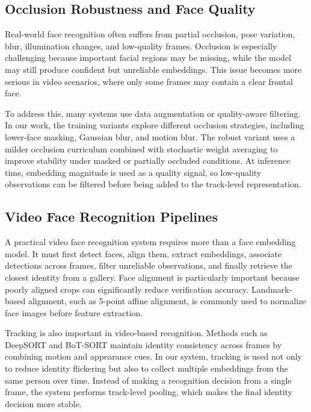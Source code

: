 \subsection{Occlusion Robustness and Face Quality}

Real-world face recognition often suffers from partial occlusion, pose variation, blur, illumination changes, and low-quality frames. Occlusion is especially challenging because important facial regions may be missing, while the model may still produce confident but unreliable embeddings. This issue becomes more serious in video scenarios, where only some frames may contain a clear frontal face.

To address this, many systems use data augmentation or quality-aware filtering. In our work, the training variants explore different occlusion strategies, including lower-face masking, Gaussian blur, and motion blur. The robust variant uses a milder occlusion curriculum combined with stochastic weight averaging to improve stability under masked or partially occluded conditions\cite{izmailov2019averagingweightsleadswider}. At inference time, embedding magnitude is used as a quality signal, so low-quality observations can be filtered before being added to the track-level representation.

\subsection{Video Face Recognition Pipelines}

A practical video face recognition system requires more than a face embedding model. It must first detect faces, align them, extract embeddings, associate detections across frames, filter unreliable observations, and finally retrieve the closest identity from a gallery. Face alignment is particularly important because poorly aligned crops can significantly reduce verification accuracy. Landmark-based alignment, such as 5-point affine alignment, is commonly used to normalize face images before feature extraction.

Tracking is also important in video-based recognition. Methods such as DeepSORT and BoT-SORT maintain identity consistency across frames by combining motion and appearance cues\cite{deepsort}\cite{botsort}. In our system, tracking is used not only to reduce identity flickering but also to collect multiple embeddings from the same person over time. Instead of making a recognition decision from a single frame, the system performs track-level pooling, which makes the final identity decision more stable.

